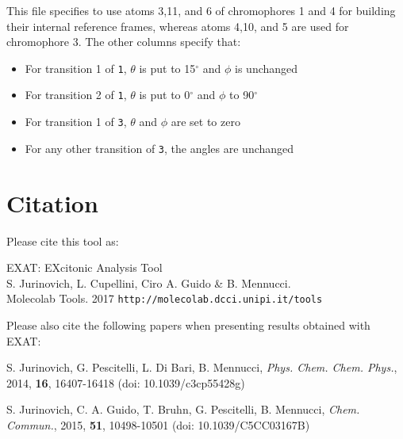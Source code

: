 \documentclass[a4paper,11pt]{article}
\begin{document}
This file specifies to use atoms 3,11, and 6 of chromophores 1 and 4 for building their internal reference frames, whereas atoms 4,10, and 5 are used for chromophore 3. 
The other columns specify that:
\begin{itemize}
\item For transition 1 of \texttt{1}, $\theta$ is put to 15$^{\circ}$ and $\phi$ is unchanged
\item For transition 2 of \texttt{1}, $\theta$ is put to 0$^{\circ}$ and $\phi$ to 90$^{\circ}$ 
\item For transition 1 of \texttt{3}, $\theta$ and $\phi$ are set to zero
\item For any other transition of \texttt{3}, the angles are unchanged 
\end{itemize}


\section{Citation}

Please cite this tool as: 

\indent EXAT: EXcitonic Analysis Tool \\
\indent S. Jurinovich, L. Cupellini, Ciro A. Guido \& B. Mennucci. \\
\indent Molecolab Tools. 2017 \texttt{http://molecolab.dcci.unipi.it/tools}

Please also cite the following papers when presenting results obtained with EXAT:


S. Jurinovich, G. Pescitelli, L. Di Bari, B. Mennucci, \emph{Phys. Chem. Chem. Phys.}, 2014, \textbf{16}, 16407-16418 (doi: 10.1039/c3cp55428g)

S. Jurinovich, C. A. Guido, T. Bruhn, G. Pescitelli, B. Mennucci,  \emph{Chem. Commun.}, 2015, \textbf{51}, 10498-10501 (doi: 10.1039/C5CC03167B)
\end{document}
